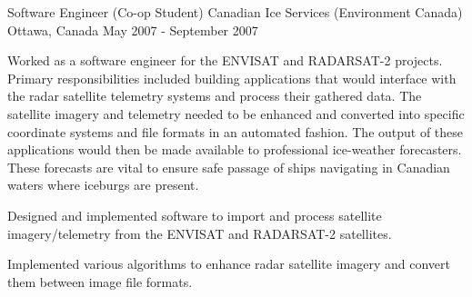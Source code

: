 \begin{cventries}

\cventry
{Software Engineer (Co-op Student)} %
{Canadian Ice Services (Environment Canada)} %
{Ottawa, Canada} %
{May 2007 - September 2007} %
{ %
\begin{cvitems}
  \item {Worked as a software engineer for the ENVISAT and RADARSAT-2 projects. Primary responsibilities included building applications that would interface with the radar satellite telemetry systems and process their gathered data. The satellite imagery and telemetry needed to be enhanced and converted into specific coordinate systems and file formats in an automated fashion. The output of these applications would then be made available to professional ice-weather forecasters. These forecasts are vital to ensure safe passage of ships navigating in Canadian waters where iceburgs are present.}
  \item {Designed and implemented software to import and process satellite imagery/telemetry from the ENVISAT and RADARSAT-2 satellites. }
  \item {Implemented various algorithms to enhance radar satellite imagery and convert them between image file formats.}
\end{cvitems}
}


\end{cventries}

